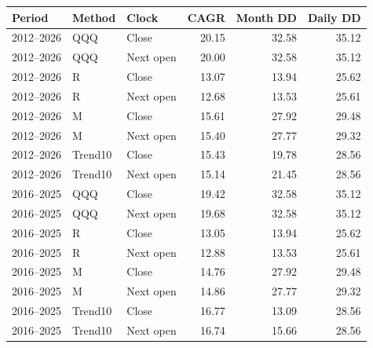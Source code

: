 \begin{tabular}{@{}lllrrr@{}}\toprule
Period & Method & Clock & CAGR & Month DD & Daily DD\\\midrule
2012--2026 & QQQ & Close & 20.15 & 32.58 & 35.12\\
2012--2026 & QQQ & Next open & 20.00 & 32.58 & 35.12\\
2012--2026 & R & Close & 13.07 & 13.94 & 25.62\\
2012--2026 & R & Next open & 12.68 & 13.53 & 25.61\\
2012--2026 & M & Close & 15.61 & 27.92 & 29.48\\
2012--2026 & M & Next open & 15.40 & 27.77 & 29.32\\
2012--2026 & Trend10 & Close & 15.43 & 19.78 & 28.56\\
2012--2026 & Trend10 & Next open & 15.14 & 21.45 & 28.56\\
2016--2025 & QQQ & Close & 19.42 & 32.58 & 35.12\\
2016--2025 & QQQ & Next open & 19.68 & 32.58 & 35.12\\
2016--2025 & R & Close & 13.05 & 13.94 & 25.62\\
2016--2025 & R & Next open & 12.88 & 13.53 & 25.61\\
2016--2025 & M & Close & 14.76 & 27.92 & 29.48\\
2016--2025 & M & Next open & 14.86 & 27.77 & 29.32\\
2016--2025 & Trend10 & Close & 16.77 & 13.09 & 28.56\\
2016--2025 & Trend10 & Next open & 16.74 & 15.66 & 28.56\\
\bottomrule\end{tabular}
